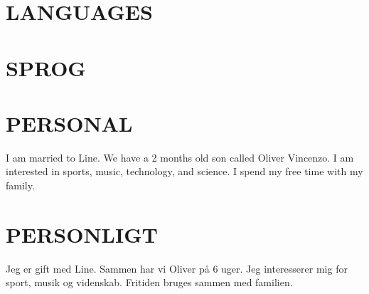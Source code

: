 \documentclass[11pt,a4paper,sans]{moderncv}        %
\begin{document}
\ifenglish
\section{LANGUAGES}
\else
\section{SPROG}
\fi

\ifenglish
\section{PERSONAL}
I am married to Line. We have a 2 months old son called Oliver Vincenzo. I am interested in sports, music, technology, and science. I spend my free time with my family.
\else
\section{PERSONLIGT}
Jeg er gift med Line. Sammen har vi Oliver på 6 uger. Jeg interesserer mig for sport, musik og videnskab. Fritiden bruges sammen med familien.
\fi
\end{document}
